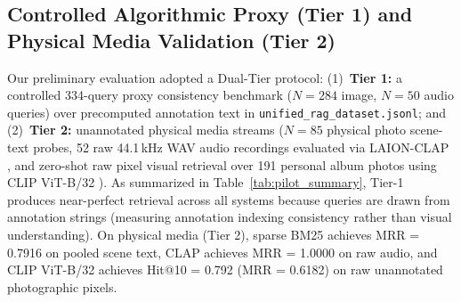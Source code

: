 \documentclass[conference]{IEEEtran}
\begin{document}
\subsection{Controlled Algorithmic Proxy (Tier 1) and Physical Media Validation (Tier 2)}
\label{sec:tier2_eval}
Our preliminary evaluation adopted a Dual-Tier protocol: (1)~\textbf{Tier 1:} a controlled 334-query proxy consistency benchmark ($N=284$ image, $N=50$ audio queries) over precomputed annotation text in \texttt{unified\_rag\_dataset.jsonl}; and (2)~\textbf{Tier 2:} unannotated physical media streams ($N=85$ physical photo scene-text probes, 52 raw 44.1\,kHz WAV audio recordings evaluated via LAION-CLAP \cite{wu2023clap}, and zero-shot raw pixel visual retrieval over 191 personal album photos using CLIP ViT-B/32 \cite{radford2021clip}). As summarized in Table~\ref{tab:pilot_summary}, Tier-1 produces near-perfect retrieval across all systems because queries are drawn from annotation strings (measuring annotation indexing consistency rather than visual understanding). On physical media (Tier 2), sparse BM25 achieves MRR = 0.7916 on pooled scene text, CLAP achieves MRR = 1.0000 on raw audio, and CLIP ViT-B/32 achieves Hit@10 = 0.792 (MRR = 0.6182) on raw unannotated photographic pixels.
\end{document}
